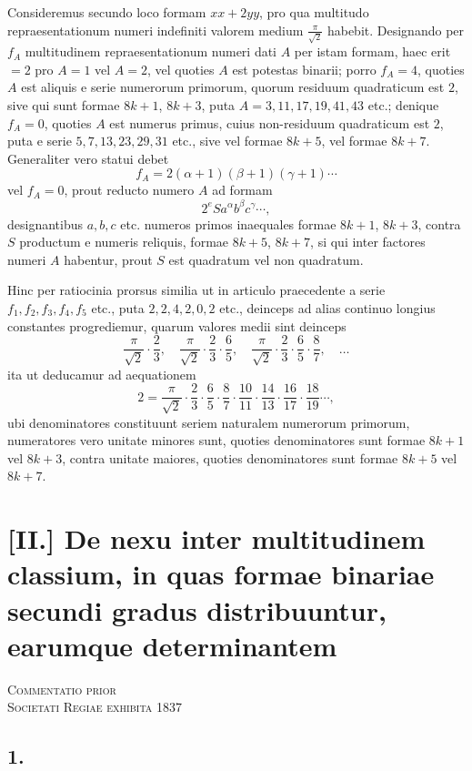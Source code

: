 \documentclass[12pt]{article}
\begin{document}
Consideremus secundo loco formam $xx+2yy$, pro qua multitudo repraesentationum numeri indefiniti valorem medium $\frac{\pi}{\sqrt2}$ habebit. Designando per $f_A$ multitudinem repraesentationum numeri dati $A$ per istam formam, haec erit $=2$ pro $A=1$ vel $A=2$, vel quoties $A$ est potestas binarii; porro $f_A=4$, quoties $A$ est aliquis e serie numerorum primorum, quorum residuum quadraticum est $2$, sive qui sunt formae $8k+1$, $8k+3$, puta $A=3,11,17,19,41,43$ etc.; denique $f_A=0$, quoties $A$ est numerus primus, cuius non-residuum quadraticum est $2$, puta e serie $5,7,13,23,29,31$ etc., sive vel formae $8k+5$, vel formae $8k+7$. Generaliter vero statui debet
\[
f_A=2(\alpha+1)(\beta+1)(\gamma+1)\cdots
\]
vel $f_A=0$, prout reducto numero $A$ ad formam
\[
2^e S a^\alpha b^\beta c^\gamma\cdots,
\]
designantibus $a,b,c$ etc. numeros primos inaequales formae $8k+1$, $8k+3$, contra $S$ productum e numeris reliquis, formae $8k+5$, $8k+7$, si qui inter factores numeri $A$ habentur, prout $S$ est quadratum vel non quadratum.

Hinc per ratiocinia prorsus similia ut in articulo praecedente a serie $f_1,f_2,f_3,f_4,f_5$ etc., puta $2,2,4,2,0,2$ etc., deinceps ad alias continuo longius constantes progrediemur, quarum valores medii sint deinceps
\[
\frac{\pi}{\sqrt2}\cdot\frac23,\quad
\frac{\pi}{\sqrt2}\cdot\frac23\cdot\frac65,\quad
\frac{\pi}{\sqrt2}\cdot\frac23\cdot\frac65\cdot\frac87,\quad \ldots
\]
ita ut deducamur ad aequationem
\[
2=\frac{\pi}{\sqrt2}\cdot\frac23\cdot\frac65\cdot\frac87\cdot\frac{10}{11}\cdot\frac{14}{13}\cdot\frac{16}{17}\cdot\frac{18}{19}\cdots,
\]
ubi denominatores constituunt seriem naturalem numerorum primorum, numeratores vero unitate minores sunt, quoties denominatores sunt formae $8k+1$ vel $8k+3$, contra unitate maiores, quoties denominatores sunt formae $8k+5$ vel $8k+7$.



\section*{[II.] De nexu inter multitudinem classium, in quas formae binariae secundi gradus distribuuntur, earumque determinantem}

\begin{center}
\textsc{Commentatio prior}\\
\textsc{Societati Regiae exhibita 1837}
\end{center}

\subsection*{1.}
\end{document}
